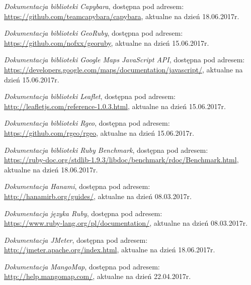 \documentclass[archivemode]{mgr}
\begin{document}
\begin{thebibliography}{99}

  \emph{Dokumentacja biblioteki Capybara}, dostępna pod adresem:\\ \url{https://github.com/teamcapybara/capybara}, aktualne na dzień 18.06.2017r.

  \emph{Dokumentacja biblioteki GeoRuby}, dostępna pod adresem:\\ \url{https://github.com/nofxx/georuby}, aktualne na dzień 15.06.2017r.

  \emph{Dokumentacja biblioteki Google Maps JavaScript API}, dostępna pod adresem:\\ \url{https://developers.google.com/maps/documentation/javascript/}, aktualne na dzień 15.06.2017r.

  \emph{Dokumentacja biblioteki Leaflet}, dostępna pod adresem:\\ \url{http://leafletjs.com/reference-1.0.3.html}, aktualne na dzień 15.06.2017r.

  \emph{Dokumentacja biblioteki Rgeo}, dostępna pod adresem:\\ \url{https://github.com/rgeo/rgeo}, aktualne na dzień 15.06.2017r.

  \emph{Dokumentacja biblioteki Ruby Benchmark}, dostępna pod adresem:\\ \url{https://ruby-doc.org/stdlib-1.9.3/libdoc/benchmark/rdoc/Benchmark.html}, aktualne na dzień 18.06.2017r.

  \emph{Dokumentacja Hanami}, dostępna pod adresem:\\ \url{http://hanamirb.org/guides/}, aktualne na dzień 08.03.2017r.

  \emph{Dokumentacja języka Ruby}, dostępna pod adresem:\\ \url{https://www.ruby-lang.org/pl/documentation/}, aktualne na dzień 08.03.2017r.

  \emph{Dokumentacja JMeter}, dostępna pod adresem:\\ \url{http://jmeter.apache.org/index.html}, aktualne na dzień 18.06.2017r.

  \emph{Dokumentacja MangoMap}, dostępna pod adresem:\\ \url{http://help.mangomap.com/}, aktualne na dzień 22.04.2017r.


\end{thebibliography}
\end{document}
